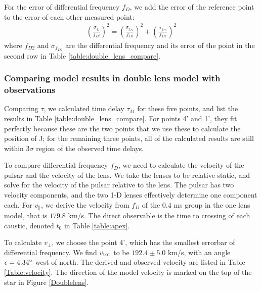 \documentclass[useAMS,usenatbib]{mn2e}
\begin{document}
For the error of differential frequency $f_D$, we add the error of the
reference point to the error of each other measured point:
\begin{equation}
\begin{aligned}
(\frac{\sigma_{f_i}}{f_{Di}})^2=(\frac{\sigma_{f_{Di}}}{f_{Di}})^2+(\frac{\sigma_{f_{D2}}}{f_{D2}})^2
\end{aligned}
\end{equation}
where $f_{D2}$ and $\sigma_{f_{D2}}$ are the differential frequency
and its error of the point in the second row in Table
\ref{table:double_lens_compare}.

\subsubsection{Comparing model results in double lens model with observations}
Comparing $\tau$, we calculated time delay $\tau_M$ for these five
points, and list the results in Table
\ref{table:double_lens_compare}. For points 4' and 1', they fit perfectly because these are the two points that we use these to calculate the position of J; for the remaining three points, all of the calculated results are still within $3\sigma$ region of the observed time delays.

To compare differential frequency $f_D$, we need to calculate the
velocity of the pulsar and the velocity of the lens. We take the
lenses to be relative static, and solve for the velocity of the pulsar
relative to the lens.  The pulsar has two velocity components, and the
two 1-D lenses effectively determine one component each.
For $v_{\parallel}$, we derive the velocity from $f_D$ of the $0.4$ ms
group in the one lens model, that is $179.8$ km/s.  The direct
observable is the time to crossing of each caustic, denoted $t_0$ in
Table \ref{table:apex}. 

To calculate $v_{\bot}$, we choose the point 4', which has the smallest
errorbar of differential frequency.
We find $v_{\rm tot}$ to be $192.4\pm 5.0$ km/s,
with an angle $\epsilon=4.34\degree$ west of north. The derived and
observed velocity are listed in Table \ref{Table:velocity}. The
direction of the model velocity is marked on the top of the star in
Figure \ref{Doublelens}.
\end{document}
